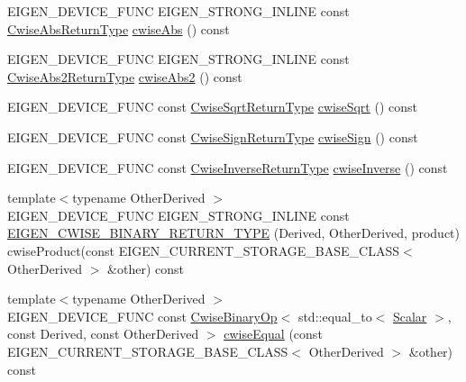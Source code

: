 \begin{DoxyCompactItemize}
\item 
E\+I\+G\+E\+N\+\_\+\+D\+E\+V\+I\+C\+E\+\_\+\+F\+U\+NC E\+I\+G\+E\+N\+\_\+\+S\+T\+R\+O\+N\+G\+\_\+\+I\+N\+L\+I\+NE const \mbox{\hyperlink{class_eigen_1_1_cwise_unary_op}{Cwise\+Abs\+Return\+Type}} \mbox{\hyperlink{class_eigen_1_1_matrix_base_a8f2dbd5d9573c79c5dd356ddb29a0ee9}{cwise\+Abs}} () const
\item 
E\+I\+G\+E\+N\+\_\+\+D\+E\+V\+I\+C\+E\+\_\+\+F\+U\+NC E\+I\+G\+E\+N\+\_\+\+S\+T\+R\+O\+N\+G\+\_\+\+I\+N\+L\+I\+NE const \mbox{\hyperlink{class_eigen_1_1_cwise_unary_op}{Cwise\+Abs2\+Return\+Type}} \mbox{\hyperlink{class_eigen_1_1_matrix_base_a60808fcf09547e14952957bbdf75d3c6}{cwise\+Abs2}} () const
\item 
E\+I\+G\+E\+N\+\_\+\+D\+E\+V\+I\+C\+E\+\_\+\+F\+U\+NC const \mbox{\hyperlink{class_eigen_1_1_cwise_unary_op}{Cwise\+Sqrt\+Return\+Type}} \mbox{\hyperlink{class_eigen_1_1_matrix_base_a8ceab546dd934174888bea8b7514ea47}{cwise\+Sqrt}} () const
\item 
E\+I\+G\+E\+N\+\_\+\+D\+E\+V\+I\+C\+E\+\_\+\+F\+U\+NC const \mbox{\hyperlink{class_eigen_1_1_cwise_unary_op}{Cwise\+Sign\+Return\+Type}} \mbox{\hyperlink{class_eigen_1_1_matrix_base_a200220dd2a2f97d4f3f68cd8a1c2b906}{cwise\+Sign}} () const
\item 
E\+I\+G\+E\+N\+\_\+\+D\+E\+V\+I\+C\+E\+\_\+\+F\+U\+NC const \mbox{\hyperlink{class_eigen_1_1_cwise_unary_op}{Cwise\+Inverse\+Return\+Type}} \mbox{\hyperlink{class_eigen_1_1_matrix_base_a96b087bbb06422f11b03a0e529064e31}{cwise\+Inverse}} () const
\item 
{\footnotesize template$<$typename Other\+Derived $>$ }\\E\+I\+G\+E\+N\+\_\+\+D\+E\+V\+I\+C\+E\+\_\+\+F\+U\+NC E\+I\+G\+E\+N\+\_\+\+S\+T\+R\+O\+N\+G\+\_\+\+I\+N\+L\+I\+NE const \mbox{\hyperlink{class_eigen_1_1_matrix_base_a297d68d9d1134a4da3dcee9dd9d6857d}{E\+I\+G\+E\+N\+\_\+\+C\+W\+I\+S\+E\+\_\+\+B\+I\+N\+A\+R\+Y\+\_\+\+R\+E\+T\+U\+R\+N\+\_\+\+T\+Y\+PE}} (Derived, Other\+Derived, product) cwise\+Product(const E\+I\+G\+E\+N\+\_\+\+C\+U\+R\+R\+E\+N\+T\+\_\+\+S\+T\+O\+R\+A\+G\+E\+\_\+\+B\+A\+S\+E\+\_\+\+C\+L\+A\+SS$<$ Other\+Derived $>$ \&other) const
\item 
{\footnotesize template$<$typename Other\+Derived $>$ }\\E\+I\+G\+E\+N\+\_\+\+D\+E\+V\+I\+C\+E\+\_\+\+F\+U\+NC const \mbox{\hyperlink{class_eigen_1_1_cwise_binary_op}{Cwise\+Binary\+Op}}$<$ std\+::equal\+\_\+to$<$ \mbox{\hyperlink{class_eigen_1_1_dense_base_a5feed465b3a8e60c47e73ecce83e39a2}{Scalar}} $>$, const Derived, const Other\+Derived $>$ \mbox{\hyperlink{class_eigen_1_1_matrix_base_a1d63c6dd2c0c6c8186fdabdf55ee1f58}{cwise\+Equal}} (const E\+I\+G\+E\+N\+\_\+\+C\+U\+R\+R\+E\+N\+T\+\_\+\+S\+T\+O\+R\+A\+G\+E\+\_\+\+B\+A\+S\+E\+\_\+\+C\+L\+A\+SS$<$ Other\+Derived $>$ \&other) const

\end{DoxyCompactItemize}
